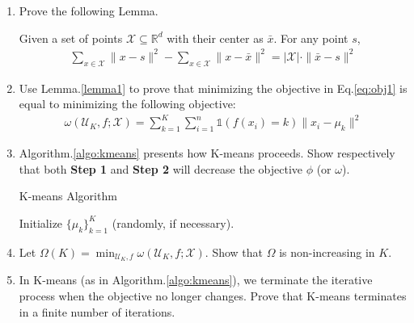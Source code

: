 \begin{enumerate}

\item Prove the following Lemma.
\begin{lemma}
\label{lemma1} 
Given a set of points $\mathcal{X} \subseteq  \mathbb{R}^d$ with their center as $\bar{x}$. For any point $s$,
\begin{align}
\sum_{x \in \mathcal{X}} \| x - s \|^2 - \sum_{x \in \mathcal{X}} \| x - \bar{x}\|^2 = | \mathcal{X} | \cdot \| \bar{x} - s\|^2
\end{align}
\end{lemma}

\item Use Lemma.\ref{lemma1} to prove that minimizing the objective in Eq.\ref{eq:obj1} is equal to minimizing the following objective:
\begin{align}
\omega(\mathcal{U}_K, f; \mathcal{X}) = \sum_{k=1}^K \sum_{i=1}^n 
\mathds{1}(f(x_i) = k ) \| x_{i} - \mu_k \|^2
\end{align}

\item
Algorithm.\ref{algo:kmeans} presents how K-means proceeds. Show respectively that both \textbf{Step 1} and \textbf{Step 2} will decrease the objective $\phi$ (or $\omega$).
\begin{algorithm}[]
\label{algo:kmeans}
\caption{K-means Algorithm}
\setcounter{AlgoLine}{0}
Initialize $\{\mu_k\}_{k=1}^K$ (randomly, if necessary).\\
\end{algorithm}

\item 
\label{K}
Let 
$
\Omega(K) = \min_{\mathcal{U}_K, f} \omega(\mathcal{U}_K, f; \mathcal{X})
$. Show that $\Omega$ is non-increasing in $K$.

\item 
In K-means (as in Algorithm.\ref{algo:kmeans}), we terminate the iterative process when the objective no longer changes. Prove that K-means terminates in a finite number of iterations. 
\end{enumerate}

